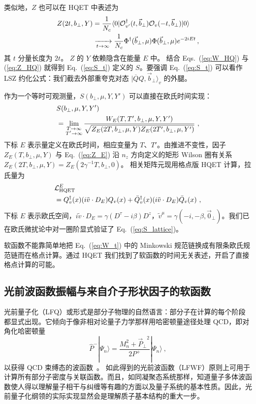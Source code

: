 类似地，$Z$ 也可以在 HQET 中表述为
\begin{align}\label{eq:Z_HQ}
	Z(2t,b_\perp,Y)&=\frac{1}{N_c}\langle0|{\cal O}^\dagger_{v'}(t,{\vec b}_\perp){\cal O}_v(-t,\vec{b}_\perp)|0\rangle \nonumber\\
	&\xrightarrow[\substack{t\to\infty}]{}\frac{1}{N_c}\Phi^\dagger({\vec b}_\perp,\mu)\Phi({\vec b}_\perp,\mu)e^{-2iEt}\,,
\end{align}
其 $t$ 分量长度为 $2t$。
%
$Z$ 的 $Y$ 依赖隐含在能量 $E$ 中。
%
结合 Eqs.~(\ref{eq:W_HQ}) 与 (\ref{eq:Z_HQ}) 就得到 Eq.~(\ref{eq:S_t}) 定义的 $S$。要强调 Eq.~(\ref{eq:S_t}) 可以看作 LSZ 约化公式：我们截去外部重夸克对态 $|\overline QQ,{\vec b}_\perp\rangle_v$ 的外腿。

作为一个等时可观测量，$S(b_\perp,\mu,Y,Y')$ 可以直接在欧氏时间实现：
\begin{align}\label{eq:S_lattice}
	&S(b_\perp,\mu,Y,Y') \\
	&=\lim_{\substack{T\to\infty\\T'\to\infty}}\frac{W_E(T,T',b_\perp,\mu,Y,Y')}{\sqrt{Z_E(2T,b_\perp,\mu,Y)Z_E(2T',b_\perp,\mu,Y')}}  \ , \nn
\end{align}
下标 $E$ 表示量定义在欧氏时间，相应变量为 $T$、$T'$。由推进不变性，因子 $Z_E(T,b_\perp,\mu,Y)$ 与 Eq.~(\ref{eq:Z_E}) 沿 $n_z$ 方向定义的矩形 Wilson 圈有关系 $Z_E(2T,b_\perp,\mu,Y)=Z_E(2\gamma^{-1}T,b_\perp,0)$。
%
相关矩阵元现用格点版 HQET 计算，拉氏量为~\cite{Aglietti:1993hf,Hashimoto:1995in,Horgan:2009ti}
\begin{align}\label{eq:L_HQ}
	&{\cal L}_{{\rm HQET}}^E  \\
	&=Q_v^\dagger(x) (i\tilde v\cdot D_E)Q_v(x)+\bar Q_v^\dagger(x) (i\tilde v\cdot D_E)\bar Q_v(x) \ , \nonumber
\end{align}
下标 $E$ 表示欧氏空间，$i\tilde v\cdot D_E=\gamma(D^\tau-i\beta )D^z$，$\tilde v^\mu=\gamma(-i,-\beta,\vec 0_\perp)$。我们已在欧氏微扰论中对一圈阶显式验证了 Eq.~(\ref{eq:S_lattice})。

软函数不能靠简单地把 Eq.~(\ref{eq:W_t}) 中的 Minkowski 规范链换成有限条欧氏规范链而在格点计算。通过 HQET 我们找到了软函数的时间无关表述，开启了直接格点计算的可能。

\subsection{光前波函数振幅与来自介子形状因子的软函数}
\label{sec:others}

光前量子化（LFQ）或形式是部分子物理的自然语言：部分子在计算的每个阶段都显式出现。它倾向于像非相对论量子力学那样用哈密顿量途径处理 QCD，即对角化哈密顿量
\begin{equation}
	\hat P^-|\Psi_n\rangle = \frac{M^2_n+{\vec P_\perp}^2}{2P^+}|\Psi_n\rangle \ ,
\end{equation}
以获得 QCD 束缚态的波函数~\cite{Brodsky:1997de}。
如此得到的光前波函数（LFWF）原则上可用于计算所有部分子密度与关联函数。而且，如同凝聚态系统那样，知道量子多体波函数使人得以理解量子相干与纠缠等有趣的方面以及量子系统的基本性质。因此，光前量子化纲领的实际实现显然会是理解质子基本结构的重大一步。


